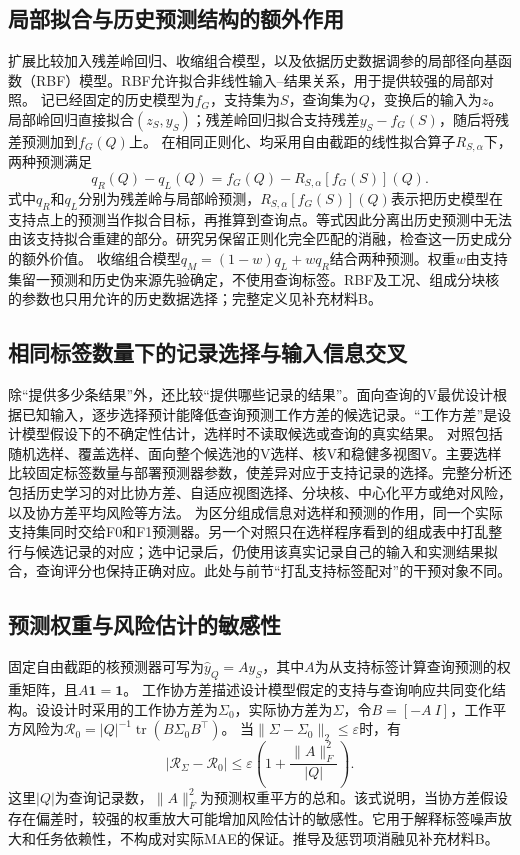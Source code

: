 \documentclass[11pt,a4paper]{article}
\begin{document}
\subsection{局部拟合与历史预测结构的额外作用}
扩展比较加入残差岭回归、收缩组合模型，以及依据历史数据调参的局部径向基函数（RBF）模型。RBF允许拟合非线性输入--结果关系，用于提供较强的局部对照。
记已经固定的历史模型为$f_G$，支持集为$S$，查询集为$Q$，变换后的输入为$z$。局部岭回归直接拟合$(z_S,y_S)$；残差岭回归拟合支持残差$y_S-f_G(S)$，随后将残差预测加到$f_G(Q)$上。
在相同正则化、均采用自由截距的线性拟合算子$R_{S,\alpha}$下，两种预测满足
\begin{equation}\label{eq:ext_projection}
q_R(Q)-q_L(Q)=f_G(Q)-R_{S,\alpha}[f_G(S)](Q).
\end{equation}
式中$q_R$和$q_L$分别为残差岭与局部岭预测，$R_{S,\alpha}[f_G(S)](Q)$表示把历史模型在支持点上的预测当作拟合目标，再推算到查询点。等式因此分离出历史预测中无法由该支持拟合重建的部分。研究另保留正则化完全匹配的消融，检查这一历史成分的额外价值。
收缩组合模型$q_M=(1-w)q_L+wq_R$结合两种预测。权重$w$由支持集留一预测和历史伪来源先验确定，不使用查询标签。RBF及工况、组成分块核的参数也只用允许的历史数据选择；完整定义见补充材料B。

\subsection{相同标签数量下的记录选择与输入信息交叉}
除“提供多少条结果”外，还比较“提供哪些记录的结果”。面向查询的V最优设计根据已知输入，逐步选择预计能降低查询预测工作方差的候选记录\cite{yubi,gorodetsky2016}。“工作方差”是设计模型假设下的不确定性估计，选样时不读取候选或查询的真实结果。
对照包括随机选样、覆盖选样、面向整个候选池的V选样、核V和稳健多视图V。主要选样比较固定标签数量与部署预测器参数，使差异对应于支持记录的选择。完整分析还包括历史学习的对比协方差、自适应视图选择、分块核、中心化平方或绝对风险，以及协方差平均风险等方法。
为区分组成信息对选样和预测的作用，同一个实际支持集同时交给F0和F1预测器。另一个对照只在选样程序看到的组成表中打乱整行与候选记录的对应；选中记录后，仍使用该真实记录自己的输入和实测结果拟合，查询评分也保持正确对应。此处与前节“打乱支持标签配对”的干预对象不同。

\subsection{预测权重与风险估计的敏感性}
固定自由截距的核预测器可写为$\widehat y_Q=Ay_S$，其中$A$为从支持标签计算查询预测的权重矩阵，且$A\mathbf1=\mathbf1$。
工作协方差描述设计模型假定的支持与查询响应共同变化结构。设设计时采用的工作协方差为$\Sigma_0$，实际协方差为$\Sigma$，令$B=[-A\ I]$，工作平方风险为$\mathcal R_0=|Q|^{-1}\operatorname{tr}(B\Sigma_0B^\top)$。
当$\|\Sigma-\Sigma_0\|_2\le\varepsilon$时，有
\begin{equation}\label{eq:ext_bound}
|\mathcal R_\Sigma-\mathcal R_0|\le\varepsilon\left(1+\frac{\|A\|_F^2}{|Q|}\right).
\end{equation}
这里$|Q|$为查询记录数，$\|A\|_F^2$为预测权重平方的总和。该式说明，当协方差假设存在偏差时，较强的权重放大可能增加风险估计的敏感性。它用于解释标签噪声放大和任务依赖性，不构成对实际MAE的保证。推导及惩罚项消融见补充材料B。
\end{document}
